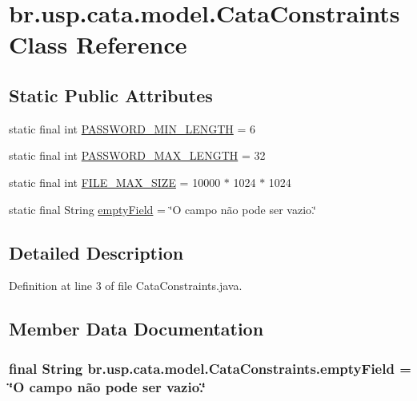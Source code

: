 \hypertarget{classbr_1_1usp_1_1cata_1_1model_1_1_cata_constraints}{\section{br.\+usp.\+cata.\+model.\+Cata\+Constraints Class Reference}
\label{classbr_1_1usp_1_1cata_1_1model_1_1_cata_constraints}
}
\subsection*{Static Public Attributes}
\begin{DoxyCompactItemize}
\item 
static final int \hyperlink{classbr_1_1usp_1_1cata_1_1model_1_1_cata_constraints_af46781448afc5578a25567594ed26b0d}{P\+A\+S\+S\+W\+O\+R\+D\+\_\+\+M\+I\+N\+\_\+\+L\+E\+N\+G\+T\+H} = 6
\item 
static final int \hyperlink{classbr_1_1usp_1_1cata_1_1model_1_1_cata_constraints_ac08f3b65dd0c6fa3dabc97fbc84e0267}{P\+A\+S\+S\+W\+O\+R\+D\+\_\+\+M\+A\+X\+\_\+\+L\+E\+N\+G\+T\+H} = 32
\item 
static final int \hyperlink{classbr_1_1usp_1_1cata_1_1model_1_1_cata_constraints_abb65bfa8959067e5fc213594296ebd01}{F\+I\+L\+E\+\_\+\+M\+A\+X\+\_\+\+S\+I\+Z\+E} = 10000 $\ast$ 1024 $\ast$ 1024
\item 
static final String \hyperlink{classbr_1_1usp_1_1cata_1_1model_1_1_cata_constraints_afcee5315edc00214389dd5fc47a49cc8}{empty\+Field} = \char`\"{}O campo não pode ser vazio.\char`\"{}
\end{DoxyCompactItemize}


\subsection{Detailed Description}


Definition at line 3 of file Cata\+Constraints.\+java.



\subsection{Member Data Documentation}
\hypertarget{classbr_1_1usp_1_1cata_1_1model_1_1_cata_constraints_afcee5315edc00214389dd5fc47a49cc8}{
\subsubsection[{empty\+Field}]{\setlength{\rightskip}{0pt plus 5cm}final String br.\+usp.\+cata.\+model.\+Cata\+Constraints.\+empty\+Field = \char`\"{}O campo não pode ser vazio.\char`\"{}\hspace{0.3cm}{\ttfamily [static]}}}\label{classbr_1_1usp_1_1cata_1_1model_1_1_cata_constraints_afcee5315edc00214389dd5fc47a49cc8}


